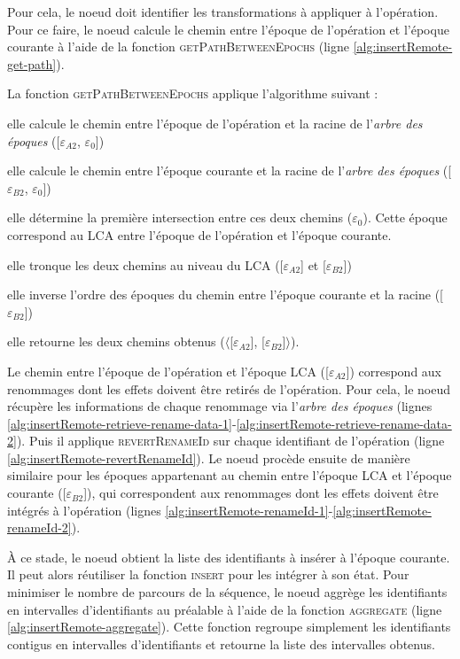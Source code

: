 \documentclass[12pt]{thesul}
\newcommand{\epoch}[1]{$\varepsilon_{#1}$}
\begin{document}
Pour cela, le noeud doit identifier les transformations à appliquer à l'opération.
Pour ce faire, le noeud calcule le chemin entre l'époque de l'opération et l'époque courante à l'aide de la fonction \textsc{getPathBetweenEpochs} (ligne \ref{alg:insertRemote-get-path}).

La fonction \textsc{getPathBetweenEpochs} applique l'algorithme suivant :
\begin{enumerate*}[label=(\roman*)]
  \item elle calcule le chemin entre l'époque de l'opération et la racine de l'\emph{arbre des époques} ([\epoch{A2}, \epoch{0}])
  \item elle calcule le chemin entre l'époque courante et la racine de l'\emph{arbre des époques} ([\epoch{B2}, \epoch{0}])
  \item elle détermine la première intersection entre ces deux chemins (\epoch{0}).
    Cette époque correspond au \acf{LCA} entre l'époque de l'opération et l'époque courante.
  \item elle tronque les deux chemins au niveau du \ac{LCA} ([\epoch{A2}] et [\epoch{B2}])
  \item elle inverse l'ordre des époques du chemin entre l'époque courante et la racine ([\epoch{B2}])
  \item elle retourne les deux chemins obtenus ($\langle$[\epoch{A2}], [\epoch{B2}]$\rangle$).
\end{enumerate*}

Le chemin entre l'époque de l'opération et l'époque \ac{LCA} ([\epoch{A2}]) correspond aux renommages dont les effets doivent être retirés de l'opération.
Pour cela, le noeud récupère les informations de chaque renommage via l'\emph{arbre des époques} (lignes \ref{alg:insertRemote-retrieve-rename-data-1}-\ref{alg:insertRemote-retrieve-rename-data-2}).
Puis il applique \textsc{revertRenameId} sur chaque identifiant de l'opération (ligne \ref{alg:insertRemote-revertRenameId}).
Le noeud procède ensuite de manière similaire pour les époques appartenant au chemin entre l'époque \ac{LCA} et l'époque courante ([\epoch{B2}]), qui correspondent aux renommages dont les effets doivent être intégrés à l'opération (lignes \ref{alg:insertRemote-renameId-1}-\ref{alg:insertRemote-renameId-2}).

À ce stade, le noeud obtient la liste des identifiants à insérer à l'époque courante.
Il peut alors réutiliser la fonction \textsc{insert} pour les intégrer à son état.
Pour minimiser le nombre de parcours de la séquence, le noeud aggrège les identifiants en intervalles d'identifiants au préalable à l'aide de la fonction \textsc{aggregate} (ligne \ref{alg:insertRemote-aggregate}).
Cette fonction regroupe simplement les identifiants contigus en intervalles d'identifiants et retourne la liste des intervalles obtenus.
\end{document}
